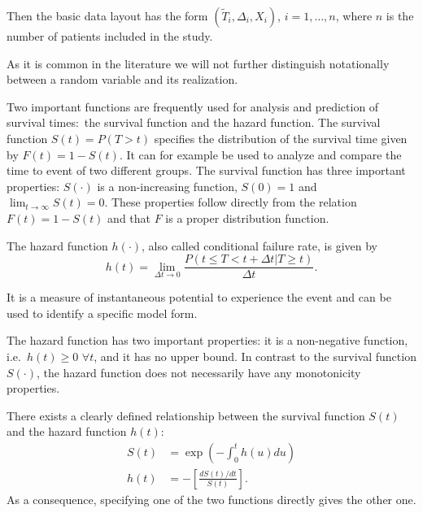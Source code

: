 \documentclass[12pt, a4paper]{scrartcl}
\theoremstyle{definition}
\theoremstyle{plain}
\numberwithin{equation}{section}
\numberwithin{figure}{section}
\numberwithin{table}{section}
\begin{document}
	Then the basic data layout has the form $(\tilde{T}_i, \Delta_i, X_i)$, $i = 1, \dots , n$, where $n$ is the number of patients included in the study.
	
	As it is common in the literature we will not further distinguish notationally between a random variable and its realization.
	
	
	Two important functions are frequently used for analysis and prediction of survival times:~the survival function and the hazard function.
	The survival function $S(t) = P(T > t)$ specifies the distribution of the survival time given by $F(t) = 1 - S(t)$.
	It can for example be used to analyze and compare the time to event of two different groups.
	The survival function has three important properties: $S(\cdot)$ is a non-increasing function, $S(0)=1$ and $\lim_{t \to \infty} S(t)=0$.
	These properties follow directly from the relation $F(t)=1-S(t)$ and that $F$ is a proper distribution function.
	
	The hazard function $h(\cdot)$, also called conditional failure rate, is given by
	\begin{equation*}
		h(t) = \lim_{\Delta t \to 0}\frac{P(t \leq T < t + \Delta t \vert T \geq t)}{\Delta t}.
	\end{equation*} 
	
	It is a measure of instantaneous potential to experience the event and can be used to identify a specific model form.
	
	The hazard function has two important properties: it is a non-negative function, i.e.~$h(t) \geq 0$ $ \forall t$, and it has no upper bound.
	In contrast to the survival function $S(\cdot)$, the hazard function does not necessarily have any monotonicity properties.

	There exists a clearly defined relationship between the survival function $S(t)$ and the hazard function $h(t)$:
	\begin{equation*}
	\begin{split}
		S(t) &= \exp \left( - \int_{0}^{t}h(u)du\right) \\
		h(t) & = - \left[ \frac{dS(t)/dt}{S(t)}\right].
	\end{split}
	\end{equation*}
	As a consequence, specifying one of the two functions directly gives the other one.
	
	
\end{document}
